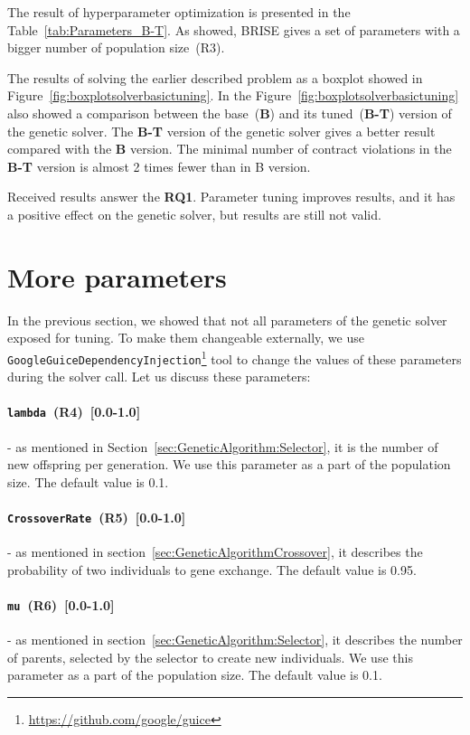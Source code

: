 The result of hyperparameter optimization is presented in the Table~\ref{tab:Parameters_B-T}. As showed, BRISE gives a set of parameters with a bigger number of population size~(R3).

The results of solving the earlier described problem as a boxplot showed in Figure~\ref{fig:boxplotsolverbasictuning}. In the Figure~\ref{fig:boxplotsolverbasictuning} also showed a comparison between the base~(\textbf{B}) and its tuned~(\textbf{B-T}) version of the genetic solver. The \textbf{B-T} version of the genetic solver gives a better result compared with the \textbf{B} version. The minimal number of contract violations in the \textbf{B-T} version is almost 2 times fewer than in B version. 

Received results answer the \textbf{RQ1}. Parameter tuning improves results, and it has a positive effect on the genetic solver, but results are still not valid. 

\section{More parameters}

In the previous section, we showed that not all parameters of the genetic solver exposed for tuning. To make them changeable externally, we use \texttt{GoogleGuiceDependencyInjection}\footnote{\url{https://github.com/google/guice}} tool to change the values of these parameters during the solver call. Let us discuss these parameters:
\paragraph{\texttt{lambda}~(R4)~[0.0-1.0]} - as mentioned in Section~\ref{sec:GeneticAlgorithm:Selector}, it is the number of new offspring per generation. We use this parameter as a part of the population size. The default value is 0.1.
\paragraph{\texttt{CrossoverRate}~(R5)~[0.0-1.0]} - as mentioned in section~\ref{sec:GeneticAlgorithmCrossover}, it describes the probability of two individuals to gene exchange. The default value is 0.95.
\paragraph{\texttt{mu}~(R6)~[0.0-1.0]} - as mentioned in section~\ref{sec:GeneticAlgorithm:Selector}, it describes the number of parents, selected by the selector to create new individuals. We use this parameter as a part of the population size. The default value is 0.1.
